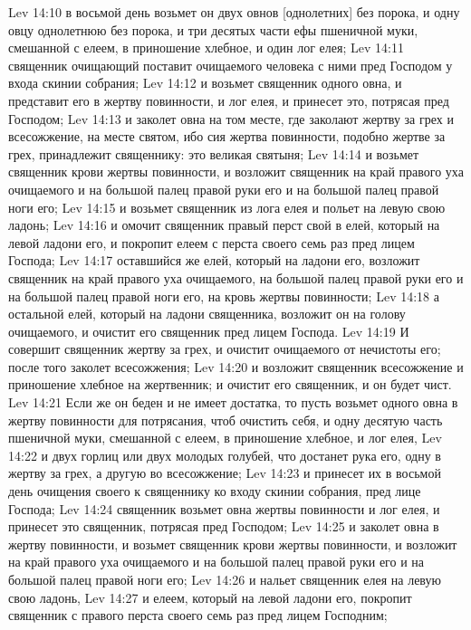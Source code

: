 \vs Lev 14:10 в восьмой день возьмет он двух овнов [однолетних] без порока, и одну овцу однолетнюю без порока, и три десятых части ефы пшеничной муки, смешанной с елеем, в приношение хлебное, и один лог елея;
\vs Lev 14:11 священник очищающий поставит очищаемого человека с ними пред Господом у входа скинии собрания;
\vs Lev 14:12 и возьмет священник одного овна, и представит его в жертву повинности, и лог елея, и принесет это, потрясая пред Господом;
\vs Lev 14:13 и заколет овна на том месте, где заколают жертву за грех и всесожжение, на месте святом, ибо сия жертва повинности, подобно жертве за грех, принадлежит священнику: это великая святыня;
\vs Lev 14:14 и возьмет священник крови жертвы повинности, и возложит священник на край правого уха очищаемого и на большой палец правой руки его и на большой палец правой ноги его;
\vs Lev 14:15 и возьмет священник из лога елея и польет на левую свою ладонь;
\vs Lev 14:16 и омочит священник правый перст свой в елей, который на левой ладони его, и покропит елеем с перста своего семь раз пред лицем Господа;
\vs Lev 14:17 оставшийся же елей, который на ладони его, возложит священник на край правого уха очищаемого, на большой палец правой руки его и на большой палец правой ноги его, на  кровь жертвы повинности;
\vs Lev 14:18 а остальной елей, который на ладони священника, возложит он на голову очищаемого, и очистит его священник пред лицем Господа.
\vs Lev 14:19 И совершит священник жертву за грех, и очистит очищаемого от нечистоты его; после того заколет  всесожжения;
\vs Lev 14:20 и возложит священник всесожжение и приношение хлебное на жертвенник; и очистит его священник, и он будет чист.
\vs Lev 14:21 Если же он беден и не имеет достатка, то пусть возьмет одного овна в жертву повинности для потрясания, чтоб очистить себя, и одну десятую часть  пшеничной муки, смешанной с елеем, в приношение хлебное, и лог елея,
\vs Lev 14:22 и двух горлиц или двух молодых голубей, что достанет рука его, одну  в жертву за грех, а другую во всесожжение;
\vs Lev 14:23 и принесет их в восьмой день очищения своего к священнику ко входу скинии собрания, пред лице Господа;
\vs Lev 14:24 священник возьмет овна жертвы повинности и лог елея, и принесет это священник, потрясая пред Господом;
\vs Lev 14:25 и заколет овна в жертву повинности, и возьмет священник крови жертвы повинности, и возложит на край правого уха очищаемого и на большой палец правой руки его и на большой палец правой ноги его;
\vs Lev 14:26 и нальет священник елея на левую свою ладонь,
\vs Lev 14:27 и елеем, который на левой ладони его, покропит священник с правого перста своего семь раз пред лицем Господним;
